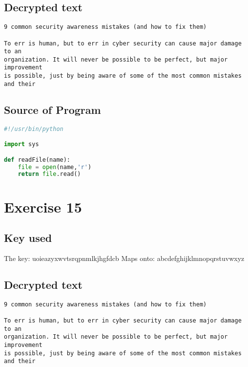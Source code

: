 \documentclass[a4paper]{article}
\begin{document}
\subsection*{Decrypted text}

\begin{verbatim}
9 common security awareness mistakes (and how to fix them)

To err is human, but to err in cyber security can cause major damage to an
organization. It will never be possible to be perfect, but major improvement
is possible, just by being aware of some of the most common mistakes and their
\end{verbatim}

\subsection*{Source of Program}

\begin{lstlisting}[language=Python]
#!/usr/bin/python

import sys

def readFile(name):
	file = open(name,'r')
	return file.read()

\end{lstlisting}

\section*{Exercise 15}

\subsection*{Key used}
The key:
uoieazyxwvtsrqpnmlkjhgfdcb\newline
Maps onto: \newline
abcdefghijklmnopqrstuvwxyz\newline

\subsection*{Decrypted text}

\begin{verbatim}
9 common security awareness mistakes (and how to fix them)

To err is human, but to err in cyber security can cause major damage to an
organization. It will never be possible to be perfect, but major improvement
is possible, just by being aware of some of the most common mistakes and their
\end{verbatim}
\end{document}
